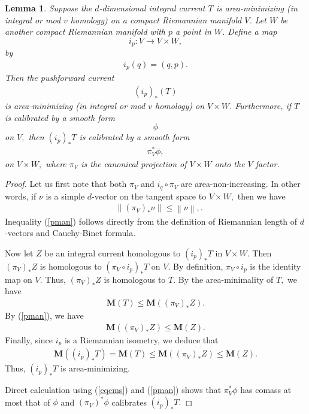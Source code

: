 \documentclass[11pt,a4paper]{amsart}
\numberwithin{equation}{section}
\newcommand{\ms}{\mathbf{M}}
\newcommand{\no}[1]{\left\lVert#1\right\rVert}
\newcommand{\du}{^\ast}
\newcommand{\pf}{_\ast}
\theoremstyle{plain}
\newtheorem{lem}[exam]{Lemma}
\theoremstyle{definition}
\numberwithin{equation}{subsection}
\begin{document}
\begin{lem}\label{lemprod}
Suppose the $d$-dimensional integral current $T$ is area-minimizing (in integral or mod $v$ homology) on a compact  Riemannian manifold $V$. Let $W$ be another  compact Riemannian manifold with $p$ a point in $W$. Define a map $$i_p:V\to V\times W,$$ by
\begin{align*}
i_p(q)=(q,p).
\end{align*}
Then the pushforward current 
\begin{align*}
(i_p)\pf(T)
\end{align*}
is area-minimizing (in integral or mod $v$ homology) on $V\times W$. Furthermore, if $T$ is calibrated by a smooth form $$\phi$$ on $V,$ then $(i_p)\pf T$ is calibrated by a smooth form
\begin{align*}
\pi_V\du\phi,
\end{align*}on $V\times W,$ where $\pi_V$ is the canonical projection of $V\times W$ onto the $V$ factor.
\end{lem}
\begin{proof}
Let us first note that both $\pi_V$ and $i_q\circ\pi_V$ are area-non-increasing. In other words, if $\nu$ is a simple $d$-vector on the tangent space to $V\times W,$ then we have 
\begin{align}
&\no{(\pi_V)\pf \nu}\le \no{\nu},\label{pman}.%
\end{align}
Inequality (\ref{pman}) follows directly from the definition of Riemannian length of $d$-vectors and Cauchy-Binet formula. %

Now let $Z$ be an integral current homologous to $(i_p)\pf T$ in $V\times W.$ Then $(\pi_V)\pf Z$ is homologous to $( \pi_V\circ i_p)\pf T$ on $V$.  By definition, $ \pi_V\circ i_p$ is the identity map on $V.$ Thus, $(\pi_V)\pf Z$ is homologous to $T.$ By the area-minimality of $T,$ we have
\begin{align*}
\ms(T)\le \ms((\pi_V)\pf Z).
\end{align*}
By (\ref{pman}), we have
\begin{align*}
\ms((\pi_V)\pf Z)\le\ms(Z).
\end{align*}
Finally, since $i_p$ is a Riemannian isometry, we deduce that
\begin{align*}
\ms((i_p)\pf T)=\ms(T)\le \ms((\pi_V)\pf Z)\le\ms(Z).
\end{align*}
Thus, $(i_p)\pf T$ is area-minimizing.

Direct calculation using (\ref{eqcms}) and (\ref{pman}) shows that $\pi_V\du \phi$ has comass at most that of $\phi$ and $(\pi_V)\du\phi$ calibrates $(i_p)\pf T.$ 
\end{proof}
\end{document}
